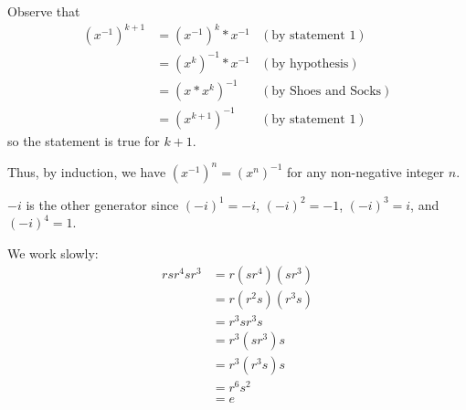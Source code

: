 \begin{questions}
    Observe that
    \begin{align*}
        (x^{-1})^{k+1} &= (x^{-1})^k \ast x^{-1} & (\text{by statement 1})\\
        &= (x^k)^{-1} \ast x^{-1} & (\text{by hypothesis})\\
        &= (x\ast x^k)^{-1} & (\text{by Shoes and Socks})\\
        &= (x^{k+1})^{-1} & (\text{by statement 1})
    \end{align*}
    so the statement is true for $k+1$.

    Thus, by induction, we have $(x^{-1})^n = (x^n)^{-1}$ for any non-negative integer $n$.

    \item $-i$ is the other generator since $(-i)^1 = -i$, $(-i)^2 = -1$, $(-i)^3 = i$, and $(-i)^4 = 1$.

    \item We work slowly:
    \begin{align*}
        rsr^4sr^3 &= r(sr^4)(sr^3)\\
        &= r(r^2s)(r^3s)\\
        &= r^3sr^3s\\
        &= r^3(sr^3)s\\
        &= r^3(r^3s)s\\
        &= r^6s^2\\
        &= e
    \end{align*}
\end{questions}
